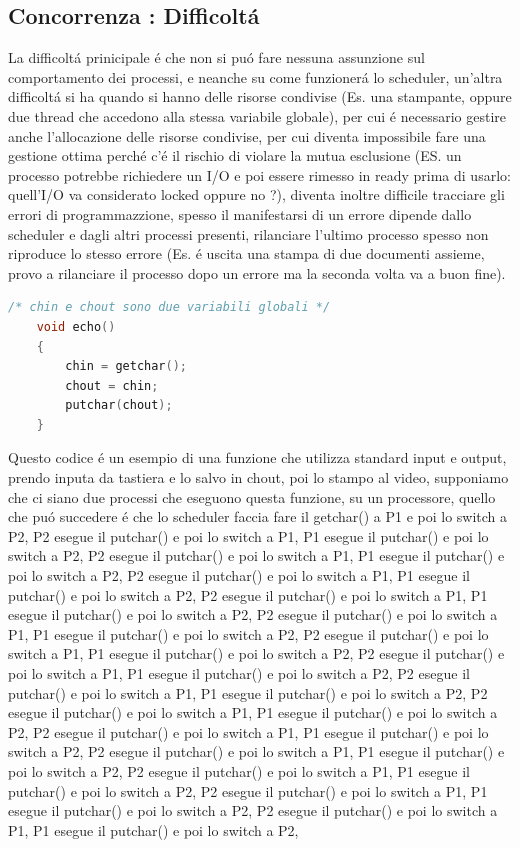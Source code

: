 \subsection{Concorrenza : Difficoltá}
La difficoltá prinicipale é che non si puó fare nessuna assunzione sul comportamento dei processi, e neanche su come funzionerá lo scheduler, un'altra
difficoltá si ha quando si hanno delle risorse condivise (Es. una stampante, oppure due thread che accedono alla stessa variabile globale), per cui é necessario gestire anche l'allocazione
delle risorse condivise, per cui diventa impossibile fare una gestione ottima perché c'é il rischio di violare la mutua esclusione (ES. un processo potrebbe richiedere un I/O e poi essere rimesso in ready prima di usarlo: quell'I/O va considerato locked oppure no ?),
diventa inoltre difficile tracciare gli errori di programmazzione, spesso il manifestarsi di un errore dipende dallo scheduler e dagli altri processi presenti, rilanciare l'ultimo processo spesso non riproduce lo stesso errore (Es. é uscita una stampa di due documenti assieme, provo a rilanciare il processo dopo un errore ma la seconda volta va a buon fine).
\begin{lstlisting}[language=C]
    /* chin e chout sono due variabili globali */
    void echo()
    {
        chin = getchar();
        chout = chin;
        putchar(chout);
    }
\end{lstlisting}
Questo codice é un esempio di una funzione che utilizza standard input e output, prendo inputa da tastiera e lo salvo in chout, poi lo stampo al video, supponiamo che ci siano due
processi che eseguono questa funzione, su un processore, quello che puó succedere é che lo scheduler faccia fare il getchar() a P1 e poi lo switch a P2, P2 esegue il putchar() e poi lo switch a P1, P1 esegue il putchar() e poi lo switch a P2, P2 esegue il putchar() e poi lo switch a P1, P1 esegue il putchar() e poi lo switch a P2, P2 esegue il putchar() e poi lo switch a P1, P1 esegue il putchar() e poi lo switch a P2, P2 esegue il putchar() e poi lo switch a P1, P1 esegue il putchar() e poi lo switch a P2, P2 esegue il putchar() e poi lo switch a P1, P1 esegue il putchar() e poi lo switch a P2, P2 esegue il putchar() e poi lo switch a P1, P1 esegue il putchar() e poi lo switch a P2, P2 esegue il putchar() e poi lo switch a P1, P1 esegue il putchar() e poi lo switch a P2, P2 esegue il putchar() e poi lo switch a P1, P1 esegue il putchar() e poi lo switch a P2, P2 esegue il putchar() e poi lo switch a P1, P1 esegue il putchar() e poi lo switch a P2, P2 esegue il putchar() e poi lo switch a P1, P1 esegue il putchar() e poi lo switch a P2, P2 esegue il putchar() e poi lo switch a P1, P1 esegue il putchar() e poi lo switch a P2, P2 esegue il putchar() e poi lo switch a P1, P1 esegue il putchar() e poi lo switch a P2, P2 esegue il putchar() e poi lo switch a P1, P1 esegue il putchar() e poi lo switch a P2, P2 esegue il putchar() e poi lo switch a P1, P1 esegue il putchar() e poi lo switch a P2,
